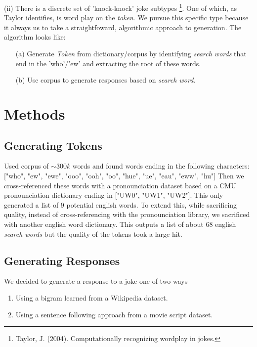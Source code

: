\documentclass[twoside,twocolumn]{article}
\begin{document}
\noindent (ii) There is a discrete set of 'knock-knock' joke subtypes \footnote{Taylor, J. (2004). Computationally recognizing wordplay in jokes.}.
One of which, as Taylor identifies, is word play on the \emph{token}. We pursue this specific type because it always us to take a straightfoward, algorithmic approach to generation.
The algorithm looks like:
\begin{center}
    \begin{enumerate}
    \item[(a)] Generate \emph{Token} from dictionary/corpus by identifying \emph{search words} that end in the 'who'/'ew' and extracting the root of these words.
    \item[(b)] Use corpus to generate responses based on \emph{search word}.
    \end{enumerate}
\end{center}



\section{Methods}

\subsection{Generating Tokens}

Used corpus of $\sim 300k$ words and found words ending in the following characters: ["who", "ew", "ewe", "ooo", "ooh", "oo", "hue", "ue", "eau", "eww", "hu"]
Then we cross-referenced these words with a pronounciation dataset based on a CMU pronounciation dictionary ending in ["UW0", "UW1", "UW2"]. 
This only generated a list of 9 potential english words. To extend this, while sacrificing quality, instead of cross-referencing with the pronounciation library, we sacrificed with another english word dictionary. 
This outputs a list of about 68 english \emph{search words} but the quality of the tokens took a large hit.

\subsection{Generating Responses}
We decided to generate a response to a joke one of two ways
\begin{enumerate}[label=(\roman*)]
\item Using a bigram learned from a Wikipedia dataset.
\item Using a sentence following approach from a movie script dataset.
\end{enumerate}
\end{document}
